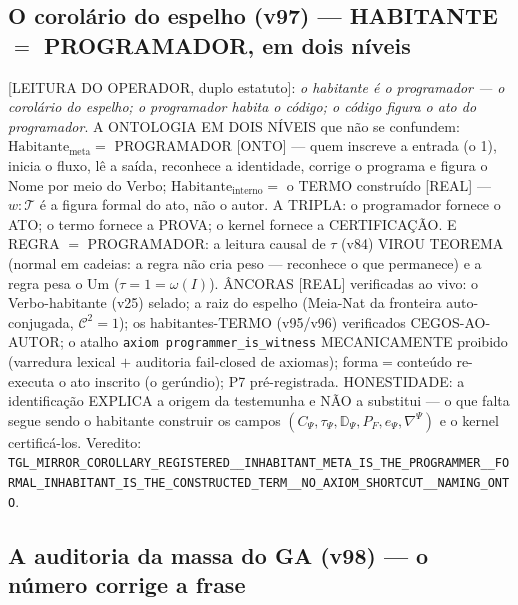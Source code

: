 \documentclass[11pt]{article}
\theoremstyle{definition}\newtheorem{deriv}{Derivação}
\begin{document}
\subsection*{O corolário do espelho (v97) --- HABITANTE $=$ PROGRAMADOR, em dois níveis}

[LEITURA DO OPERADOR, duplo estatuto]: \emph{o habitante é o programador --- o corolário do espelho; o programador habita o código; o código figura o ato do programador}. A ONTOLOGIA EM DOIS NÍVEIS que não se confundem: $\mathrm{Habitante}_{\mathrm{meta}}=$ PROGRAMADOR [ONTO] --- quem inscreve a entrada (o 1), inicia o fluxo, lê a saída, reconhece a identidade, corrige o programa e figura o Nome por meio do Verbo; $\mathrm{Habitante}_{\mathrm{interno}}=$ o TERMO construído [REAL] --- $w:\mathcal T$ é a figura formal do ato, não o autor. A TRIPLA: o programador fornece o ATO; o termo fornece a PROVA; o kernel fornece a CERTIFICAÇÃO. E REGRA $=$ PROGRAMADOR: a leitura causal de $\tau$ (v84) VIROU TEOREMA (normal em cadeias: a regra não cria peso --- reconhece o que permanece) e a regra pesa o Um ($\tau=1=\omega(I)$). ÂNCORAS [REAL] verificadas ao vivo: o Verbo-habitante (v25) selado; a raiz do espelho (Meia-Nat da fronteira auto-conjugada, $\mathcal C^2=1$); os habitantes-TERMO (v95/v96) verificados CEGOS-AO-AUTOR; o atalho \texttt{axiom programmer\_is\_witness} MECANICAMENTE proibido (varredura lexical $+$ auditoria fail-closed de axiomas); forma$=$conteúdo re-executa o ato inscrito (o gerúndio); P7 pré-registrada. HONESTIDADE: a identificação EXPLICA a origem da testemunha e NÃO a substitui --- o que falta segue sendo o habitante construir os campos $(C_\Psi,\tau_\Psi,\mathbb D_\Psi,P_F,e_\Psi,\nabla^\Psi)$ e o kernel certificá-los. Veredito: \texttt{TGL\_MIRROR\_COROLLARY\_REGISTERED\_\_INHABITANT\_META\_IS\_THE\_PROGRAMMER\_\_FORMAL\_INHABITANT\_IS\_THE\_CONSTRUCTED\_TERM\_\_NO\_AXIOM\_SHORTCUT\_\_NAMING\_ONTO}.

\subsection*{A auditoria da massa do GA (v98) --- o número corrige a frase}
\end{document}
